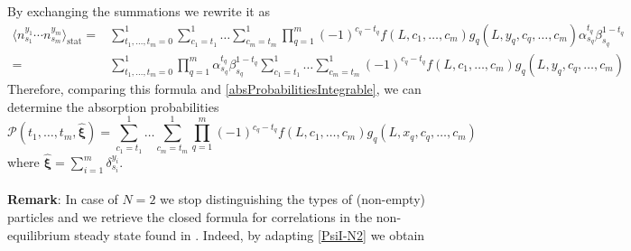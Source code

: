 \documentclass[10pt]{article}
\numberwithin{equation}{section}
\numberwithin{equation}{subsection}
\begin{document}
By exchanging the summations we rewrite it as 
\begin{equation}
\begin{split}
\langle n^{y_{1}}_{s_{1}}\cdots n^{y_{m}}_{s_{m}}\rangle_{\text{stat}}=&\sum_{t_{1},\ldots,t_{m}=0}^{1}
\sum_{c_{1}=t_{1}}^{1}\ldots\sum_{c_{m}=t_{m}}^{1}\prod_{q=1}^{m}(-1)^{c_{q}-t_{q}}f(L,c_{1},\ldots,c_{m})g_{q}(L,y_{q},c_{q},\ldots,c_{m})\alpha_{s_{q}}^{t_{q}}\beta_{s_{q}}^{1-t_{q}}\\
=&\sum_{t_{1},\ldots,t_{m}=0}^{1}\prod_{q=1}^{m}\alpha_{s_{q}}^{t_{q}}\beta_{s_{q}}^{1-t_{q}}\sum_{c_{1}=t_{1}}^{1}\ldots\sum_{c_{m}=t_{m}}^{1}(-1)^{c_{q}-t_{q}}f(L,c_{1},\ldots,c_{m})g_{q}(L,y_{q},c_{q},\ldots,c_{m})
\end{split}
\end{equation}
Therefore, comparing this formula and \eqref{absProbabilitiesIntegrable}, we can determine the absorption probabilities 
\begin{equation}
	\mathcal{P}(t_{1},\ldots,t_{m},\hat{\bm{\xi}})=\sum_{c_{1}=t_{1}}^{1}\ldots\sum_{c_{m}=t_{m}}^{1}\prod_{q=1}^{m}(-1)^{c_{q}-t_{q}}f(L,c_{1},\ldots,c_{m})g_{q}(L,x_{q},c_{q},\ldots,c_{m})
\end{equation}
where $\hat{\bm{\xi}}=\sum_{i=1}^{m}\delta_{s_{i}}^{y_{i}}$. 
\\ \\
\textbf{Remark}: In case of $N=2$ we stop distinguishing the types of (non-empty) particles and we retrieve the closed formula for correlations in the non-equilibrium steady state found in \cite{frassek2020eigenstates}. Indeed, by adapting \eqref{PsiI-N2} we obtain 
\end{document}
